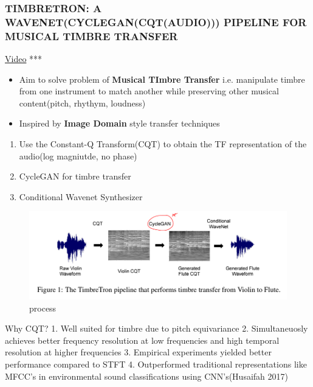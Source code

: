\documentclass[11pt]{article}
\makeatletter
\def\maxwidth{\ifdim\Gin@nat@width>\linewidth\linewidth
    \else\Gin@nat@width\fi}
\let\Oldincludegraphics\includegraphics
\renewcommand{\includegraphics}[1]{\Oldincludegraphics[width=.8\maxwidth]{#1}}
\providecommand{\tightlist}{%
      \setlength{\itemsep}{0pt}\setlength{\parskip}{0pt}}
\makeatother
\begin{document}
\subsubsection{TIMBRETRON: A WAVENET(CYCLEGAN(CQT(AUDIO))) PIPELINE FOR
MUSICAL TIMBRE
TRANSFER}\label{timbretron-a-wavenetcyclegancqtaudio-pipeline-for-musical-timbre-transfer}

\href{http://www.cs.toronto.edu/~huang/TimbreTron/index.html}{Video} ***

    \begin{itemize}
\tightlist
\item
  Aim to solve problem of \textbf{Musical TImbre Transfer} i.e.
  manipulate timbre from one instrument to match another while
  preserving other musical content(pitch, rhythym, loudness)
\item
  Inspired by \textbf{Image Domain} style transfer techniques
\end{itemize}

    \begin{enumerate}
\def\labelenumi{\arabic{enumi}.}
\tightlist
\item
  Use the Constant-Q Transform(CQT) to obtain the TF representation of
  the audio(log magniutde, no phase)
\item
  CycleGAN for timbre transfer
\item
  Conditional Wavenet Synthesizer
\end{enumerate}

\begin{figure}
\centering
\includegraphics{fig_03.PNG}
\caption{process}
\end{figure}

    Why CQT? 1. Well suited for timbre due to pitch equivariance 2.
Simultaneuosly achieves better frequency resolution at low frequencies
and high temporal resolution at higher frequencies 3. Empirical
experiments yielded better performance compared to STFT 4. Outperformed
traditional representations like MFCC's in environmental sound
classifications using CNN's(Husaifah 2017)
\end{document}
